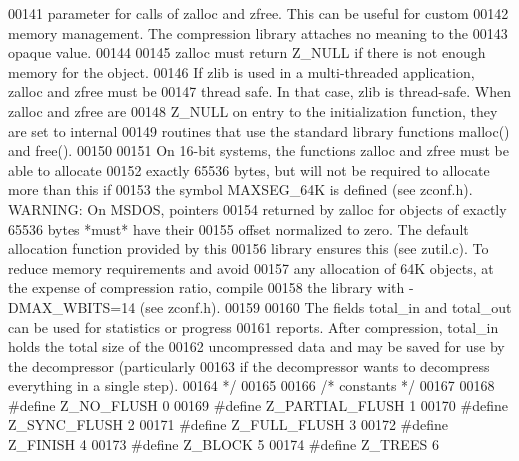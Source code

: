 \begin{DoxyCode}
00141 \textcolor{comment}{   parameter for calls of zalloc and zfree.  This can be useful for custom}
00142 \textcolor{comment}{   memory management.  The compression library attaches no meaning to the}
00143 \textcolor{comment}{   opaque value.}
00144 \textcolor{comment}{}
00145 \textcolor{comment}{     zalloc must return Z\_NULL if there is not enough memory for the object.}
00146 \textcolor{comment}{   If zlib is used in a multi-threaded application, zalloc and zfree must be}
00147 \textcolor{comment}{   thread safe.  In that case, zlib is thread-safe.  When zalloc and zfree are}
00148 \textcolor{comment}{   Z\_NULL on entry to the initialization function, they are set to internal}
00149 \textcolor{comment}{   routines that use the standard library functions malloc() and free().}
00150 \textcolor{comment}{}
00151 \textcolor{comment}{     On 16-bit systems, the functions zalloc and zfree must be able to allocate}
00152 \textcolor{comment}{   exactly 65536 bytes, but will not be required to allocate more than this if}
00153 \textcolor{comment}{   the symbol MAXSEG\_64K is defined (see zconf.h).  WARNING: On MSDOS, pointers}
00154 \textcolor{comment}{   returned by zalloc for objects of exactly 65536 bytes *must* have their}
00155 \textcolor{comment}{   offset normalized to zero.  The default allocation function provided by this}
00156 \textcolor{comment}{   library ensures this (see zutil.c).  To reduce memory requirements and avoid}
00157 \textcolor{comment}{   any allocation of 64K objects, at the expense of compression ratio, compile}
00158 \textcolor{comment}{   the library with -DMAX\_WBITS=14 (see zconf.h).}
00159 \textcolor{comment}{}
00160 \textcolor{comment}{     The fields total\_in and total\_out can be used for statistics or progress}
00161 \textcolor{comment}{   reports.  After compression, total\_in holds the total size of the}
00162 \textcolor{comment}{   uncompressed data and may be saved for use by the decompressor (particularly}
00163 \textcolor{comment}{   if the decompressor wants to decompress everything in a single step).}
00164 \textcolor{comment}{*/}
00165 
00166                         \textcolor{comment}{/* constants */}
00167 
00168 \textcolor{preprocessor}{#define Z\_NO\_FLUSH      0}
00169 \textcolor{preprocessor}{#define Z\_PARTIAL\_FLUSH 1}
00170 \textcolor{preprocessor}{#define Z\_SYNC\_FLUSH    2}
00171 \textcolor{preprocessor}{#define Z\_FULL\_FLUSH    3}
00172 \textcolor{preprocessor}{#define Z\_FINISH        4}
00173 \textcolor{preprocessor}{#define Z\_BLOCK         5}
00174 \textcolor{preprocessor}{#define Z\_TREES         6}

\end{DoxyCode}
